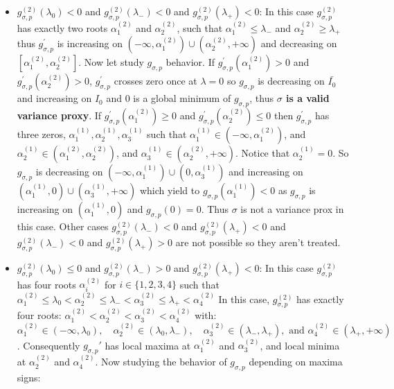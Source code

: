 \documentclass[a4paper, 10pt]{article}
\theoremstyle{definition}
\begin{document}
\begin{itemize}
\begin{itemize}
    \item  $g_{\sigma, p}^{(2)}(\lambda_0) < 0$ and $g_{\sigma, p}^{(2)}(\lambda_-)< 0$ and $g_{\sigma, p}^{(2)}(\lambda_+)< 0$: In this case $g_{\sigma, p}^{(2)}$ has exactly two roots $\alpha_1^{(2)}$ and $\alpha_2^{(2)}$, such that $\alpha_1^{(2)} \leq \lambda_-$ and $\alpha_2^{(2)} \geq \lambda_+ $ thus $g_{\sigma, p}^{'}$ is increasing on $(-\infty, \alpha_1^{(2)}) \cup(\alpha_2^{(2)},+\infty)$ and decreasing on $[\alpha_1^{(2)}, \alpha_2^{(2)}]$. Now let study $g_{\sigma, p}$ behavior. If $g_{\sigma, p}^{'}(\alpha_1^{(2)}) > 0$ and $g_{\sigma, p}^{'}(\alpha_2^{(2)})>0$, $g_{\sigma, p}^{'}$  crosses zero once at $\lambda=0$ so $g_{\sigma, p}$ is decreasing on $\bar{I_0}$ and increasing on $I_0$ and 0 is a global minimum of $g_{\sigma, p}$, thus \textbf{$\sigma$ is a valid variance proxy}. If  $g_{\sigma, p}^{'}(\alpha_1^{(2)}) \geq 0 $ and $g_{\sigma, p}^{'}(\alpha_2^{(2)}) \leq 0$  then $g_{\sigma, p}^{'}$  has three zeros, $\alpha_1^{(1)}, \alpha_2^{(1)}, \alpha_3^{(1)}$ such that  $\alpha_1^{(1)} \in (-\infty, \alpha_1^{(2)})$, and $\alpha_2^{(1)} \in (\alpha_1^{(2)}, \alpha_2^{(2)})$, and  $\alpha_3^{(1)} \in (\alpha_2^{(2)}, +\infty)$.  Notice that $\alpha_2^{(1)} = 0$. So $g_{\sigma, p}$ is decreasing on $(-\infty, \alpha_1^{(1)}) \cup (0, \alpha_3^{(1)})$ and increasing on $(\alpha_1^{(1)}, 0) \cup ( \alpha_3^{(1)}, +\infty)$ which yield to $g_{\sigma, p}(\alpha_1^{(1)}) < 0$ as $g_{\sigma, p}$ is increasing on $(\alpha_1^{(1)},0)$ and $g_{\sigma, p}(0)=0$. Thus $\sigma$ is not a variance prox in this case. Other cases  $g_{\sigma, p}^{(2)}(\lambda_-)< 0$ and $g_{\sigma, p}^{(2)}(\lambda_+)< 0$ and $g_{\sigma, p}^{(2)}(\lambda_-)< 0$ and $g_{\sigma, p}^{(2)}(\lambda_+)> 0$ are not possible so they aren't treated.
    \item  $g_{\sigma, p}^{(2)}(\lambda_0) \leq 0$ and $g_{\sigma, p}^{(2)}(\lambda_-) > 0$ and $g_{\sigma, p}^{(2)}(\lambda_+) < 0$: In this  case $g_{\sigma, p}^{(2)}$ has four roots $\alpha_i^{(2)}$ for $i \in \{1,2,3,4\}$ such that $\alpha_1^{(2)} \leq \lambda_0 < \alpha_2^{(2)} \leq \lambda_- <\alpha_3^{(2)} \leq \lambda_+ < \alpha_4^{(2)}$
    In this case, \( g_{\sigma,p}^{(2)} \) has exactly four roots: $\alpha_1^{(2)} < \alpha_2^{(2)} < \alpha_3^{(2)} < \alpha_4^{(2)}$ with: $\alpha_1^{(2)} \in (-\infty, \lambda_0), \quad \alpha_2^{(2)} \in (\lambda_0, \lambda_-), \quad \alpha_3^{(2)} \in (\lambda_-, \lambda_+), \text{ and } \alpha_4^{(2)} \in (\lambda_+, +\infty)$. Consequently $g_{\sigma,p}'$ has local maxima at \( \alpha_1^{(2)} \) and \( \alpha_3^{(2)} \), and local minima at \( \alpha_2^{(2)} \) and \( \alpha_4^{(2)} \). Now studying the behavior of \( g_{\sigma,p} \) depending on maxima signs:

\end{itemize}
\end{itemize}
\end{document}
